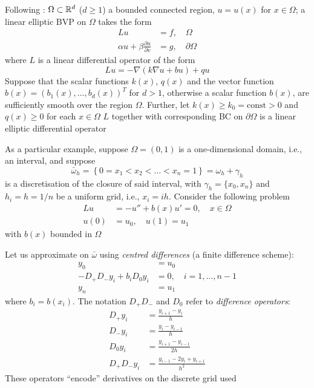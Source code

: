 \documentclass[aspectratio=169]{beamer}
\begin{document}
\begin{frame}
Following \cite{Windisch1989}: $\Omega\subset\mathbb{R}^d$ ($d\geq 1$) a bounded connected region, $u=u(x)$ for $x\in\Omega$; a linear elliptic BVP on $\Omega$ takes the form 
\begin{subequations}\label{sys:PDE}
\begin{align}
Lu &= f,\quad \Omega \\
\alpha u+\beta \frac{\partial u}{\partial v} &= g, \quad \partial\Omega
\end{align}
\end{subequations}
where $L$ is a linear differential operator of the form
\[
Lu = -\nabla(k\nabla u+bu)+qu
\]
Suppose that the scalar functions $k(x)$, $q(x)$ and the vector function
$b(x)=(b_1(x),\ldots,b_d(x))^T$ for $d>1$, otherwise a scalar function
$b(x)$, are sufficiently smooth over the region $\Omega$. 
Further, let $k(x)\geq k_0=\textrm{const} > 0$ and $q(x)\geq 0$ for each $x\in\Omega$
\vfill
$L$ together with corresponding BC on $\partial\Omega$ is a linear elliptic differential operator
\end{frame}


\begin{frame} 
As a particular example, suppose $\Omega=(0,1)$ is a one-dimensional domain, i.e., an interval, and suppose
\[
\bar{\omega}_h=
\left\{
0=x_1<x_2<\ldots<x_n=1
\right\}
=\omega_h+\gamma_h
\]
is a discretisation of the closure of said interval, with $\gamma_h=\{x_0,x_n\}$ and $h_i=h=1/n$ be a uniform grid, i.e., $x_i=ih$. Consider the following problem
\begin{subequations}
\begin{align}
Lu &= -u''+b(x)u'=0,\quad x\in\Omega \\
u(0) &= u_0,\quad u(1)=u_1
\end{align}
\end{subequations}
with $b(x)$ bounded in $\Omega$
\end{frame}

\begin{frame} 
Let us approximate on $\bar{\omega}$ using \emph{centred differences} (a finite difference scheme):
\begin{subequations}
\begin{align}
y_0 &= u_0 \\
-D_+D_-y_i +b_iD_0y_i &= 0, \quad i=1,\ldots,n-1 \\
y_n &= u_1
\end{align}
\end{subequations}
where $b_i=b(x_i)$. The notation $D_+D_-$ and $D_0$ refer to \emph{difference operators}:
\begin{subequations}
\begin{align}
D_+y_i &= \frac{y_{i+1}-y_i}{h} \\
D_-y_i &= \frac{y_{i}-y_{i-1}}{h} \\
D_0y_i &= \frac{y_{i+1}-y_{i-1}}{2h} \\
D_+D_-y_i &= \frac{y_{i-1}-2y_i+y_{i+1}}{h^2}
\end{align}
\end{subequations}
These operators ``encode'' derivatives on the discrete grid used
\end{frame}
\end{document}
